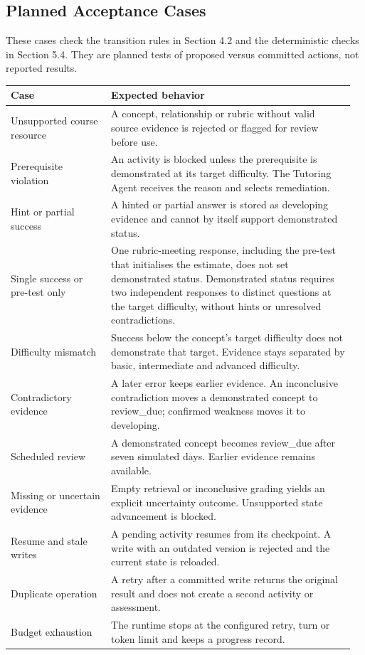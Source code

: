 \documentclass{article}
\begin{document}
\subsection{Planned Acceptance Cases}

These cases check the transition rules in Section 4.2 and the deterministic checks in Section 5.4. They are planned tests of proposed versus committed actions, not reported results.

{\small
\begin{tabular}{@{}>{\raggedright\arraybackslash}p{0.28\linewidth}>{\raggedright\arraybackslash}p{0.68\linewidth}@{}}
\toprule
\textbf{Case} & \textbf{Expected behavior} \\
\midrule
Unsupported course resource & A concept, relationship or rubric without valid source evidence is rejected or flagged for review before use. \\
\addlinespace[2pt]
Prerequisite violation & An activity is blocked unless the prerequisite is demonstrated at its target difficulty. The Tutoring Agent receives the reason and selects remediation. \\
\addlinespace[2pt]
Hint or partial success & A hinted or partial answer is stored as developing evidence and cannot by itself support demonstrated status. \\
\addlinespace[2pt]
Single success or pre-test only & One rubric-meeting response, including the pre-test that initialises the estimate, does not set demonstrated status. Demonstrated status requires two independent responses to distinct questions at the target difficulty, without hints or unresolved contradictions. \\
\addlinespace[2pt]
Difficulty mismatch & Success below the concept's target difficulty does not demonstrate that target. Evidence stays separated by basic, intermediate and advanced difficulty. \\
\addlinespace[2pt]
Contradictory evidence & A later error keeps earlier evidence. An inconclusive contradiction moves a demonstrated concept to review\_due; confirmed weakness moves it to developing. \\
\addlinespace[2pt]
Scheduled review & A demonstrated concept becomes review\_due after seven simulated days. Earlier evidence remains available. \\
\addlinespace[2pt]
Missing or uncertain evidence & Empty retrieval or inconclusive grading yields an explicit uncertainty outcome. Unsupported state advancement is blocked. \\
\addlinespace[2pt]
Resume and stale writes & A pending activity resumes from its checkpoint. A write with an outdated version is rejected and the current state is reloaded. \\
\addlinespace[2pt]
Duplicate operation & A retry after a committed write returns the original result and does not create a second activity or assessment. \\
\addlinespace[2pt]
Budget exhaustion & The runtime stops at the configured retry, turn or token limit and keeps a progress record. \\
\bottomrule
\end{tabular}
}
\end{document}
